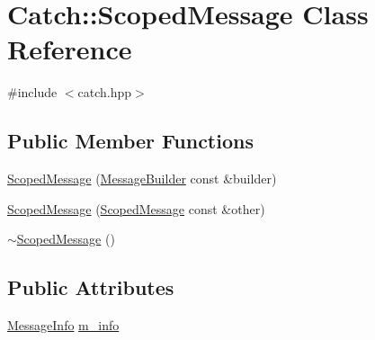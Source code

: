 \hypertarget{classCatch_1_1ScopedMessage}{\section{Catch\-:\-:Scoped\-Message Class Reference}
\label{classCatch_1_1ScopedMessage}
}


{\ttfamily \#include $<$catch.\-hpp$>$}

\subsection*{Public Member Functions}
\begin{DoxyCompactItemize}
\item 
\hyperlink{classCatch_1_1ScopedMessage_a5cc59f0f2ebe840e6607f83004d49a17}{Scoped\-Message} (\hyperlink{structCatch_1_1MessageBuilder}{Message\-Builder} const \&builder)
\item 
\hyperlink{classCatch_1_1ScopedMessage_ae03a17fd47220d563d4abc73e7518e29}{Scoped\-Message} (\hyperlink{classCatch_1_1ScopedMessage}{Scoped\-Message} const \&other)
\item 
\hyperlink{classCatch_1_1ScopedMessage_a43190843f9eeb84a0b42b0bc95fdf93a}{$\sim$\-Scoped\-Message} ()
\end{DoxyCompactItemize}
\subsection*{Public Attributes}
\begin{DoxyCompactItemize}
\item 
\hyperlink{structCatch_1_1MessageInfo}{Message\-Info} \hyperlink{classCatch_1_1ScopedMessage_ae6e1476f389cc6e1586f033b3747b27b}{m\-\_\-info}
\end{DoxyCompactItemize}


